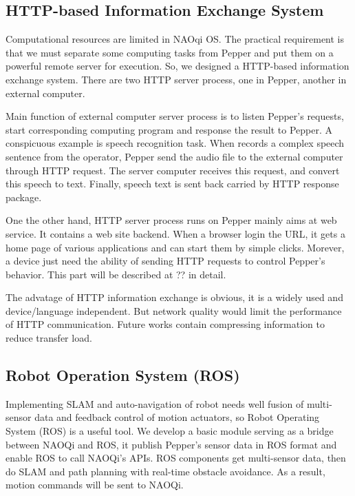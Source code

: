\subsection{HTTP-based Information Exchange System}
\label{subsec:http}
Computational resources are limited in NAOqi OS. 
The practical requirement is that we must separate some computing tasks from Pepper and put them on a powerful remote server for execution. 
So, we designed a HTTP-based information exchange system. There are two HTTP server process, one in Pepper, another in external computer. 

Main function of external computer server process is to listen Pepper’s requests, start corresponding computing program and response the result to Pepper. 
A conspicuous example is speech recognition task. 
When records a complex speech sentence from the operator, Pepper send the audio file to the external computer through HTTP request. 
The server computer receives this request, and convert this speech to text. 
Finally, speech text is sent back carried by HTTP response package. 

One the other hand, HTTP server process runs on Pepper mainly aims at web service. 
It contains a web site backend. 
When a browser login the URL, it gets a home page of various applications and can start them by simple clicks. 
Morever, a device just need the ability of sending HTTP requests to control Pepper’s behavior. 
This part will be described at ?? in detail. 

The advatage of HTTP information exchange is obvious, it is a widely used and device/language independent. 
But network quality would limit the performance of HTTP communication. 
Future works contain compressing information to reduce transfer load.

\subsection{Robot Operation System (ROS)}
\label{subsec:ros}

Implementing SLAM and auto-navigation of robot needs well fusion of multi-sensor data and feedback control of motion actuators, so Robot Operating System (ROS) is a useful tool. 
We develop a basic module serving as a bridge between NAOQi and ROS, it publish Pepper’s sensor data in ROS format and enable ROS to call NAOQi’s APIs. 
ROS components get multi-sensor data, then do SLAM and path planning with real-time obstacle avoidance. 
As a result, motion commands will be sent to NAOQi.